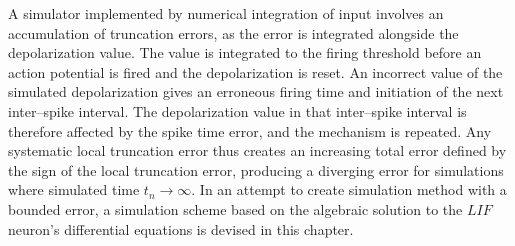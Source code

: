 \documentclass[b5paper,12 pt]{report}
\begin{document}
A simulator implemented by numerical integration of input involves an accumulation of truncation errors, as the error is integrated alongside the depolarization value. %
The value is integrated to the firing threshold before an action potential is fired and the depolarization is reset. %
An incorrect value of the simulated depolarization gives an erroneous firing time and initiation of the next inter--spike interval.
The depolarization value in that inter--spike interval is therefore affected by the spike time error, and the mechanism is repeated.
Any systematic local truncation error thus creates an increasing total error defined by the sign of the local truncation error, producing a diverging error for simulations where simulated time $t_n \to \infty$.
In an attempt to create simulation method with a bounded error, a simulation scheme based on the algebraic solution to the $LIF$ neuron's differential equations is devised in this chapter.
\end{document}
